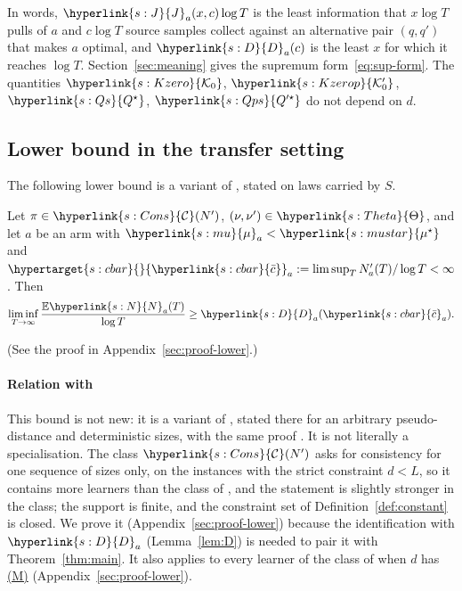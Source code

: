 \documentclass[11pt]{article}
\newcommand{\E}{\mathbb{E}}
\newcommand{\dt}[1]{\hypertarget{#1}{}}
\newcommand{\sy}[2]{{\hyperlink{#1}{#2}}}
\newcommand{\term}[2]{\hyperlink{#1}{#2}}
\newcommand{\propM}{\term{s:M}{(M)}}
\newcommand{\mk}{\sy{s:mu}{\mu}}
\newcommand{\mus}{\sy{s:mustar}{\mu^{\star}}}
\newcommand{\Nc}{\sy{s:N}{N}}
\newcommand{\Thet}{\sy{s:Theta}{\Theta}}
\newcommand{\Cons}{\sy{s:Cons}{\mathcal{C}}}
\newcommand{\Jf}{\sy{s:J}{J}}
\newcommand{\Dc}{\sy{s:D}{D}}
\newcommand{\Ko}{\sy{s:Kzero}{\mathcal{K}_{0}}}
\newcommand{\Kop}{\sy{s:Kzerop}{\mathcal{K}'_{0}}}
\newcommand{\Qs}{\sy{s:Qs}{Q^{\star}}}
\newcommand{\Qps}{\sy{s:Qps}{Q'^{\star}}}
\newcommand{\cbar}{\sy{s:cbar}{\bar c}}
\begin{document}
In words, $\Jf_a(x,c)\log T$ is the least information that $x\log T$ pulls of $a$ and $c\log T$ source
samples collect against an alternative pair $(q,q')$ that makes $a$ optimal, and $\Dc_a(c)$ is the
least $x$ for which it reaches $\log T$. Section~\ref{sec:meaning} gives the supremum
form~\eqref{eq:sup-form}. The quantities $\Ko$, $\Kop$, $\Qs$, $\Qps$ do not depend on $d$.

\subsection{Lower bound in the transfer setting}

The following lower bound is a variant of \citet[Theorem~3]{PMM25}, stated on laws carried by $S$.

\begin{proposition}\label{prop:lower}
Let $\pi\in\Cons(N')$, $(\nu,\nu')\in\Thet$, and let $a$ be an arm with $\mk_a<\mus$ and
$\dt{s:cbar}\cbar_a:=\limsup_{T}N'_a(T)/\log T<\infty$. Then
\begin{equation*}
\liminf_{T\to\infty}\frac{\E \Nc_a(T)}{\log T}\ge \Dc_a(\cbar_a).
\end{equation*}
\end{proposition}

(See the proof in Appendix~\ref{sec:proof-lower}.)

\paragraph{Relation with \texorpdfstring{\citet{PMM25}}{Prevost et al. (2025)}} This bound is not
new: it is a variant of \citet[Theorem~3]{PMM25}, stated there for an arbitrary pseudo-distance and
deterministic sizes, with the same proof \citep[Appendix~A]{PMM25}. It is not literally a
specialisation. The class $\Cons(N')$ asks for consistency for one sequence of sizes only, on the
instances with the strict constraint $d<L$, so it contains more learners than the class of
\citet[Definition~2]{PMM25}, and the statement is slightly stronger in the class; the support is
finite, and the constraint set of Definition~\ref{def:constant} is closed. We prove it
(Appendix~\ref{sec:proof-lower}) because the identification with $\Dc_a$ (Lemma~\ref{lem:D}) is
needed to pair it with Theorem~\ref{thm:main}. It also applies to every learner of the class of
\citet[Section~4.2]{PMRM26} when $d$ has \propM{} (Appendix~\ref{sec:proof-lower}).
\end{document}

